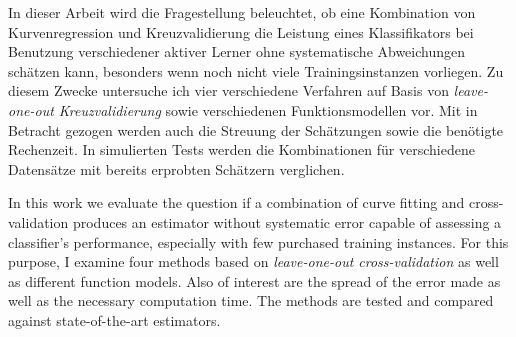 
In dieser Arbeit wird die Fragestellung beleuchtet, ob eine Kombination von Kurvenregression und Kreuzvalidierung die Leistung eines Klassifikators bei Benutzung verschiedener aktiver Lerner ohne systematische Abweichungen schätzen kann, besonders wenn noch nicht viele Trainingsinstanzen vorliegen. Zu diesem Zwecke untersuche ich vier verschiedene Verfahren auf Basis von \textit{leave-one-out Kreuzvalidierung} sowie verschiedenen Funktionsmodellen vor. Mit in Betracht gezogen werden auch die Streuung der Schätzungen sowie die benötigte Rechenzeit. In simulierten Tests werden die Kombinationen für verschiedene Datensätze mit bereits erprobten Schätzern verglichen.

In this work we evaluate the question if a combination of curve fitting and cross-validation produces an estimator without systematic error capable of assessing a classifier's performance, especially with few purchased training instances. For this purpose, I examine four methods based on \textit{leave-one-out cross-validation} as well as different function models. Also of interest are the spread of the error made as well as the necessary computation time. The methods are tested and compared against state-of-the-art estimators.